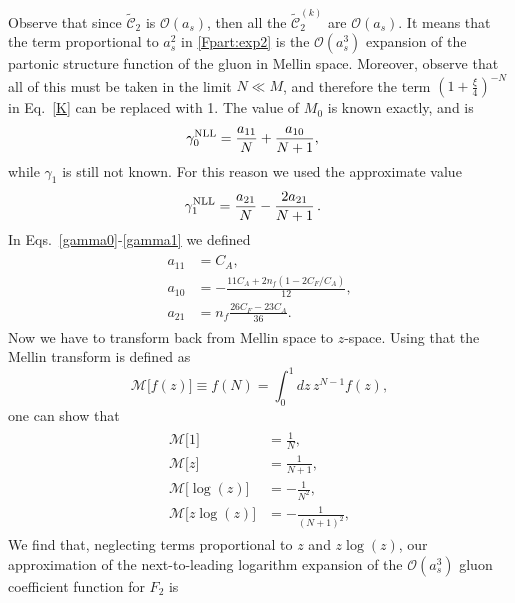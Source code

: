 \documentclass[a4paper]{article}
\newcommand{\ord}[1]{\mathcal{O} (a_s^{#1})}
\newcommand{\C}[0]{\tilde{\mathcal{C}}}
\begin{document}
Observe that since $\C_2$ is $\ord{}$, then all the $\C_2^{(k)}$ are $\ord{}$. It means that the term proportional to $a_s^2$ in \eqref{Fpart:exp2} is the $\ord{3}$ expansion of the partonic structure function of the gluon in Mellin space.
Moreover, observe that all of this must be taken in the limit $N \ll M$, and therefore the term $\left(1+\frac{\xi}{4}\right)^{-N}$ in Eq.~\eqref{K} can be replaced with 1.
The value of $M_0$ is known exactly, and is
\begin{align}
	\label{gamma0}
	\gamma^{\rm NLL}_0&=\frac{a_{11}}{N}+\frac{a_{10}}{N+1},
\end{align}
while $\gamma_1$ is still not known. For this reason we used the approximate value
\begin{align}
	\label{gamma1}
	\gamma^{\rm NLL}_1&=\frac{a_{21}}{N}-\frac{2a_{21}}{N+1}\,.
\end{align}
In Eqs.~\eqref{gamma0}-\eqref{gamma1} we defined
\begin{align}
	\begin{split}
	a_{11}&=C_A, \\
	a_{10}&=-\frac{11C_A + 2n_f(1-2C_F/C_A)}{12}, \\
	a_{21}&=n_f\frac{26C_F - 23C_A}{36}.
	\end{split}
\end{align}
Now we have to transform back from Mellin space to $z$-space. Using that the Mellin transform is defined as
\begin{equation}
	\mathcal{M}\bigl[f(z)\bigr]\equiv f(N)=\int_0^1dz\,z^{N-1}f(z),
\end{equation}
one can show that
\begin{align}
	\begin{split}
	\mathcal{M}\bigl[1\bigr]&=\frac{1}{N}, \\
	\mathcal{M}\bigl[z\bigr]&=\frac{1}{N+1}, \\
	\mathcal{M}\bigl[\log(z)\bigr]&=-\frac{1}{N^2}, \\
	\mathcal{M}\bigl[z\log(z)\bigr]&=-\frac{1}{(N+1)^2},
	\end{split}
\end{align}
We find that, neglecting terms proportional to $z$ and $z\log(z)$, our approximation of the next-to-leading logarithm expansion of the $\ord{3}$ gluon coefficient function for $F_2$ is
\begingroup
\allowdisplaybreaks
\end{document}
